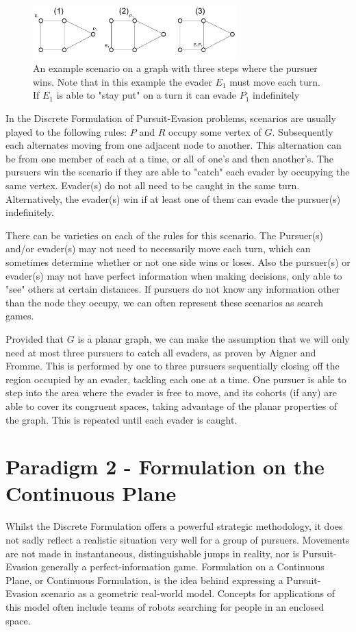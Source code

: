 \documentclass{article}
\begin{document}
\begin{figure}[htb]
\centering
\includegraphics[width=0.7\textwidth]{"graph2_steps"}
\caption{An example scenario on a graph with three steps where the pursuer wins. Note that in this example the evader \(E_1\) must move each turn. If \(E_1\) is able to "stay put" on a turn it can evade \(P_1\) indefinitely}
\end{figure}

In the Discrete Formulation of Pursuit-Evasion problems, scenarios are usually played to the following rules: \(P\) and \(R\) occupy some vertex of \(G\). Subsequently each alternates moving from one adjacent node to another. This alternation can be from one member of each at a time, or all of one's and then another's. The pursuers win the scenario if they are able to "catch" each evader by occupying the same vertex. Evader(s) do not all need to be caught in the same turn. Alternatively, the evader(s) win if at least one of them can evade the pursuer(s) indefinitely.\cite{copsRobbers}

There can be varieties on each of the rules for this scenario. The Pursuer(s) and/or evader(s) may not need to necessarily move each turn, which can sometimes determine whether or not one side wins or loses. Also the pursuer(s) or evader(s) may not have perfect information when making decisions, only able to "see" others at certain distances. If pursuers do not know any information other than the node they occupy, we can often represent these scenarios as search games. \cite{parsons}

Provided that \(G\) is a planar graph, we can make the assumption that we will only need at most three pursuers to catch all evaders, as proven by Aigner and Fromme. This is performed by one to three pursuers sequentially closing off the region occupied by an evader, tackling each one at a time. One pursuer is able to step into the area where the evader is free to move, and its cohorts (if any) are able to cover its congruent spaces, taking advantage of the planar properties of the graph. This is repeated until each evader is caught. \cite{copsRobbers}

\section{Paradigm 2 - Formulation on the Continuous Plane}
Whilst the Discrete Formulation offers a powerful strategic methodology, it does not sadly reflect a realistic situation very well for a group of pursuers. Movements are not made in instantaneous, distinguishable jumps in reality, nor is Pursuit-Evasion generally a perfect-information game. Formulation on a Continuous Plane, or Continuous Formulation, is the idea behind expressing a Pursuit-Evasion scenario as a geometric real-world model. Concepts for applications of this model often include teams of robots searching for people in an enclosed space.
\end{document}
